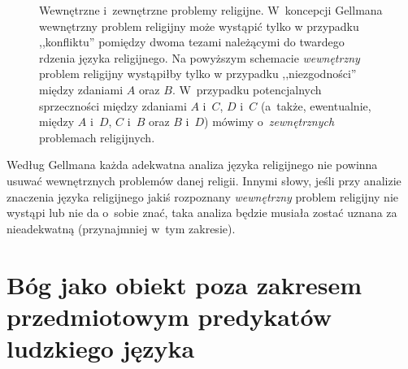 \begin{figure}[H]
\begin{center}

\caption[Wewnętrzne i~zewnętrzne problemy religijne według Gellmana]{Wewnętrzne i~zewnętrzne problemy religijne. W~koncepcji Gellmana wewnętrzny problem religijny może wystąpić tylko w przypadku ,,konfliktu'' pomiędzy dwoma tezami należącymi do twardego rdzenia języka religijnego. Na powyższym schemacie \textit{wewnętrzny} problem religijny wystąpiłby tylko w przypadku ,,niezgodności'' między zdaniami $A$ oraz $B$. W~przypadku potencjalnych sprzeczności między zdaniami $A$ i~$C$, $D$ i~$C$ (a~także, ewentualnie, między $A$ i~$D$, $C$ i~$B$ oraz $B$ i~$D$) mówimy o~\textit{zewnętrznych} problemach religijnych.}\label{sil-gell-prob}
\end{center}
\end{figure}

Według Gellmana każda adekwatna analiza języka religijnego nie powinna usuwać wewnętrznych problemów danej religii. Innymi słowy, jeśli przy analizie znaczenia języka religijnego jakiś rozpoznany \textit{wewnętrzny} problem religijny nie wystąpi lub nie da o~sobie znać, taka analiza będzie musiała zostać uznana za nieadekwatną (przynajmniej w~tym zakresie).


\section{Bóg jako obiekt poza zakresem przedmiotowym predykatów ludzkiego języka}

